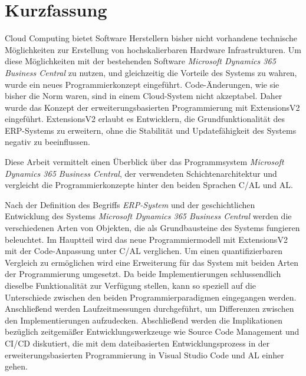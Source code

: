 \chapter*{Kurzfassung}

Cloud Computing bietet Software Herstellern bisher nicht vorhandene technische Möglichkeiten zur Erstellung von hochskalierbaren Hardware Infrastrukturen. Um diese Möglichkeiten mit der bestehenden Software \textit{Microsoft Dynamics 365 Business Central} zu nutzen, und gleichzeitig die Vorteile des Systems zu wahren, wurde ein neues Programmierkonzept eingeführt. Code-Änderungen, wie sie bisher die Norm waren, sind in einem Cloud-System nicht akzeptabel. Daher wurde das Konzept der erweiterungsbasierten Programmierung mit ExtensionsV2 eingeführt. ExtensionsV2 erlaubt es Entwicklern, die Grundfunktionalität des ERP-Systems zu erweitern, ohne die Stabilität und Updatefähigkeit des Systems negativ zu beeinflussen.


Diese Arbeit vermittelt einen Überblick über das Programmsystem \textit{Microsoft Dynamics 365 Business Central}, der verwendeten Schichtenarchitektur und vergleicht die Programmierkonzepte hinter den beiden Sprachen C/AL und AL.


Nach der Definition des Begriffs \textit{ERP-System} und der geschichtlichen Entwicklung des Systems \textit{Microsoft Dynamics 365 Business Central} werden die verschiedenen Arten von Objekten, die als Grundbausteine des Systems fungieren beleuchtet. Im Hauptteil wird das neue Programmiermodell mit ExtensionsV2 mit der Code-Anpassung unter C/AL verglichen.  Um einen quantifizierbaren Vergleich zu ermöglichen wird eine Erweiterung für das System mit beiden Arten der Programmierung umgesetzt. Da beide Implementierungen schlussendlich dieselbe Funktionalität zur Verfügung stellen, kann so speziell auf die Unterschiede zwischen den beiden Programmierparadigmen eingegangen werden. Anschließend werden Laufzeitmessungen durchgeführt, um Differenzen zwischen den Implementierungen aufzudecken. Abschließend werden die Implikationen bezüglich zeitgemäßer Entwicklungswerkzeuge wie Source Code Management und CI/CD diskutiert, die mit dem dateibasierten Entwicklungsprozess in der erweiterungsbasierten Programmierung in Visual Studio Code und AL einher gehen.